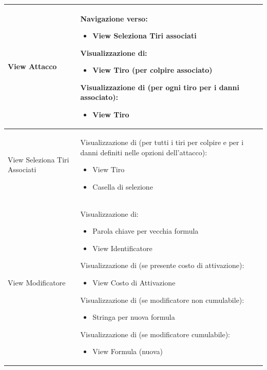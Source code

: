 \documentclass[a4paper, 11pt]{article}
\begin{document}
\begin{adjustwidth}{-1.5cm}{-1.5cm}
\begin{center}
\begin{longtable}{|p{5cm}|p{5cm}|p{5cm}|}
        View Attacco & 
        Navigazione verso:
        \begin{itemize}
            \item View Seleziona Tiri associati
        \end{itemize}
        Visualizzazione di:
        \begin{itemize}
            \item View Tiro (per colpire associato)
        \end{itemize}
        Visualizzazione di (per ogni tiro per i danni associato):
        \begin{itemize}
            \item View Tiro
        \end{itemize} & 
        \\\hline
        
        View Seleziona Tiri Associati & 
        Visualizzazione di (per tutti i tiri per colpire e per i danni definiti nelle opzioni dell’attacco):
        \begin{itemize}
            \item View Tiro
            \item Casella di selezione 
        \end{itemize}
        & 
        \\ \hline
        
        View Modificatore & 
        Visualizzazione di:
        \begin{itemize}
            \item Parola chiave per vecchia formula
            \item View Identificatore
        \end{itemize}
        Visualizzazione di (se presente costo di attivazione):
        \begin{itemize}
            \item View Costo di Attivazione
        \end{itemize}
        Visualizzazione di (se modificatore non cumulabile):
        \begin{itemize}
            \item Stringa per nuova formula
        \end{itemize}
        Visualizzazione di (se modificatore cumulabile):
        \begin{itemize}
            \item View Formula (nuova)
        \end{itemize} &  \\ \hline
        

\end{longtable}
\end{center}
\end{adjustwidth}
\end{document}
